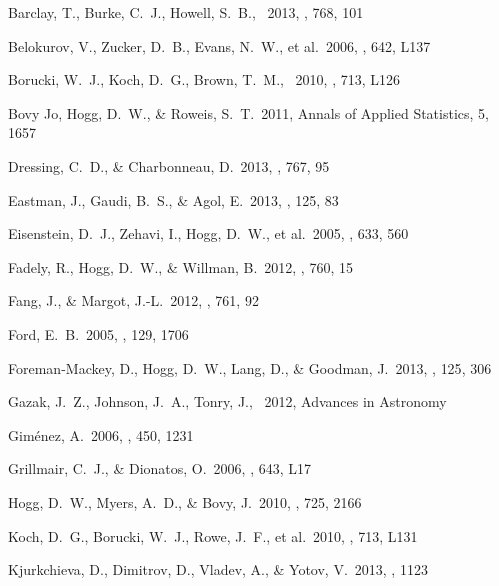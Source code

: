 \documentclass[letterpaper,12pt,preprint]{hack_aastex}
\begin{document}
\clearpage
\begin{thebibliography}{}\raggedright%

Barclay, T., Burke, C.~J., Howell, S.~B., \etal\ 2013, \apj, {768}, 101

Belokurov, V., Zucker, D.~B., Evans, N.~W., et al.\ 2006, \apjl, 642, L137

Borucki, W.~J., Koch, D.~G., Brown, T.~M., \etal\ 2010, \apjl, {713}, L126

Bovy Jo, Hogg, D.~W., \& Roweis, S.~T.\ 2011, Annals of Applied Statistics,
5, 1657

Dressing, C.~D., \& Charbonneau, D.\ 2013, \apj, {767}, 95

Eastman, J., Gaudi, B.~S., \& Agol, E.\ 2013, \pasp, {125}, 83

Eisenstein, D.~J., Zehavi, I., Hogg, D.~W., et al.\ 2005, \apj, 633, 560

Fadely, R., Hogg, D.~W., \& Willman, B.\ 2012, \apj, 760, 15

Fang, J., \& Margot, J.-L.\ 2012, \apj, 761, 92

Ford, E.~B.\ 2005, \aj, {129}, 1706

Foreman-Mackey, D., Hogg, D.~W., Lang, D., \& Goodman, J.\ 2013,
\pasp, {125}, 306

Gazak, J.~Z., Johnson, J.~A., Tonry, J., \etal\ 2012, Advances in Astronomy

Gim{\'e}nez, A.\ 2006, \aap, {450}, 1231

Grillmair, C.~J., \& Dionatos, O.\ 2006, \apjl, 643, L17

Hogg, D.~W., Myers, A.~D., \& Bovy, J.\ 2010, \apj, 725, 2166

Koch, D.~G., Borucki, W.~J., Rowe, J.~F., et al.\ 2010, \apjl,
713, L131

Kjurkchieva, D., Dimitrov, D., Vladev, A., \& Yotov, V.\ 2013, \mnras,
1123


\end{thebibliography}
\end{document}
